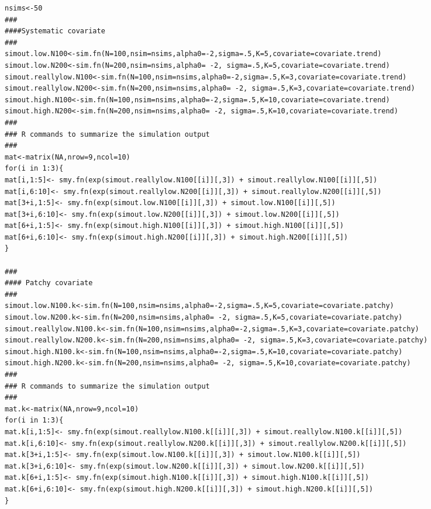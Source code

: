 \documentclass[12pt]{article}
\begin{document}
\begin{spacing}{1.2}
{\begin{verbatim}
nsims<-50
###
####Systematic covariate 
###
simout.low.N100<-sim.fn(N=100,nsim=nsims,alpha0=-2,sigma=.5,K=5,covariate=covariate.trend)
simout.low.N200<-sim.fn(N=200,nsim=nsims,alpha0= -2, sigma=.5,K=5,covariate=covariate.trend)
simout.reallylow.N100<-sim.fn(N=100,nsim=nsims,alpha0=-2,sigma=.5,K=3,covariate=covariate.trend)
simout.reallylow.N200<-sim.fn(N=200,nsim=nsims,alpha0= -2, sigma=.5,K=3,covariate=covariate.trend)
simout.high.N100<-sim.fn(N=100,nsim=nsims,alpha0=-2,sigma=.5,K=10,covariate=covariate.trend)
simout.high.N200<-sim.fn(N=200,nsim=nsims,alpha0= -2, sigma=.5,K=10,covariate=covariate.trend)
###
### R commands to summarize the simulation output
###
mat<-matrix(NA,nrow=9,ncol=10)
for(i in 1:3){
mat[i,1:5]<- smy.fn(exp(simout.reallylow.N100[[i]][,3]) + simout.reallylow.N100[[i]][,5])
mat[i,6:10]<- smy.fn(exp(simout.reallylow.N200[[i]][,3]) + simout.reallylow.N200[[i]][,5])
mat[3+i,1:5]<- smy.fn(exp(simout.low.N100[[i]][,3]) + simout.low.N100[[i]][,5])
mat[3+i,6:10]<- smy.fn(exp(simout.low.N200[[i]][,3]) + simout.low.N200[[i]][,5])
mat[6+i,1:5]<- smy.fn(exp(simout.high.N100[[i]][,3]) + simout.high.N100[[i]][,5])
mat[6+i,6:10]<- smy.fn(exp(simout.high.N200[[i]][,3]) + simout.high.N200[[i]][,5])
}

### 
#### Patchy covariate
###
simout.low.N100.k<-sim.fn(N=100,nsim=nsims,alpha0=-2,sigma=.5,K=5,covariate=covariate.patchy)
simout.low.N200.k<-sim.fn(N=200,nsim=nsims,alpha0= -2, sigma=.5,K=5,covariate=covariate.patchy)
simout.reallylow.N100.k<-sim.fn(N=100,nsim=nsims,alpha0=-2,sigma=.5,K=3,covariate=covariate.patchy)
simout.reallylow.N200.k<-sim.fn(N=200,nsim=nsims,alpha0= -2, sigma=.5,K=3,covariate=covariate.patchy)
simout.high.N100.k<-sim.fn(N=100,nsim=nsims,alpha0=-2,sigma=.5,K=10,covariate=covariate.patchy)
simout.high.N200.k<-sim.fn(N=200,nsim=nsims,alpha0= -2, sigma=.5,K=10,covariate=covariate.patchy)
###
### R commands to summarize the simulation output
###
mat.k<-matrix(NA,nrow=9,ncol=10)
for(i in 1:3){
mat.k[i,1:5]<- smy.fn(exp(simout.reallylow.N100.k[[i]][,3]) + simout.reallylow.N100.k[[i]][,5])
mat.k[i,6:10]<- smy.fn(exp(simout.reallylow.N200.k[[i]][,3]) + simout.reallylow.N200.k[[i]][,5])
mat.k[3+i,1:5]<- smy.fn(exp(simout.low.N100.k[[i]][,3]) + simout.low.N100.k[[i]][,5])
mat.k[3+i,6:10]<- smy.fn(exp(simout.low.N200.k[[i]][,3]) + simout.low.N200.k[[i]][,5])
mat.k[6+i,1:5]<- smy.fn(exp(simout.high.N100.k[[i]][,3]) + simout.high.N100.k[[i]][,5])
mat.k[6+i,6:10]<- smy.fn(exp(simout.high.N200.k[[i]][,3]) + simout.high.N200.k[[i]][,5])
}




\end{verbatim}}
\end{spacing}
\end{document}
